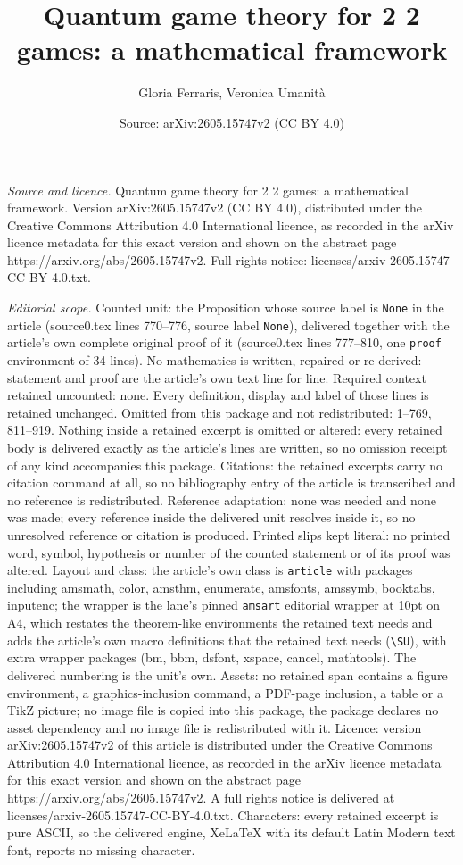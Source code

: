 \documentclass[10pt,a4paper]{amsart}
\title[Quantum game theory for 2 2 games: a mathematical framework]{Quantum game theory for 2 2 games: a mathematical framework}
\author{Gloria Ferraris, Veronica Umanit\`a}
\date{Source: arXiv:2605.15747v2 (CC BY 4.0)}
\begin{document}
\maketitle

\noindent\emph{Source and licence.} Quantum game theory for 2 2 games: a mathematical framework. Version arXiv:2605.15747v2 (CC BY 4.0), distributed under the Creative Commons Attribution 4.0 International licence, as recorded in the arXiv licence metadata for this exact version and shown on the abstract page https://arxiv.org/abs/2605.15747v2. Full rights notice: licenses/arxiv-2605.15747-CC-BY-4.0.txt.\par\smallskip

\noindent\textit{Editorial scope.} Counted unit: the Proposition whose source label is \texttt{None} in the article (source0.tex lines 770--776, source label \texttt{None}), delivered together with the article's own complete original proof of it (source0.tex lines 777--810, one \texttt{proof} environment of 34 lines). No mathematics is written, repaired or re-derived: statement and proof are the article's own text line for line. Required context retained uncounted: none. Every definition, display and label of those lines is retained unchanged. Omitted from this package and not redistributed: 1--769, 811--919. Nothing inside a retained excerpt is omitted or altered: every retained body is delivered exactly as the article's lines are written, so no omission receipt of any kind accompanies this package. Citations: the retained excerpts carry no citation command at all, so no bibliography entry of the article is transcribed and no reference is redistributed. Reference adaptation: none was needed and none was made; every reference inside the delivered unit resolves inside it, so no unresolved reference or citation is produced. Printed slips kept literal: no printed word, symbol, hypothesis or number of the counted statement or of its proof was altered. Layout and class: the article's own class is \texttt{article} with packages including amsmath, color, amsthm, enumerate, amsfonts, amssymb, booktabs, inputenc; the wrapper is the lane's pinned \texttt{amsart} editorial wrapper at 10pt on A4, which restates the theorem-like environments the retained text needs and adds the article's own macro definitions that the retained text needs (\texttt{\textbackslash SU}), with extra wrapper packages (bm, bbm, dsfont, xspace, cancel, mathtools). The delivered numbering is the unit's own. Assets: no retained span contains a figure environment, a graphics-inclusion command, a PDF-page inclusion, a table or a TikZ picture; no image file is copied into this package, the package declares no asset dependency and no image file is redistributed with it. Licence: version arXiv:2605.15747v2 of this article is distributed under the Creative Commons Attribution 4.0 International licence, as recorded in the arXiv licence metadata for this exact version and shown on the abstract page https://arxiv.org/abs/2605.15747v2. A full rights notice is delivered at licenses/arxiv-2605.15747-CC-BY-4.0.txt. Characters: every retained excerpt is pure ASCII, so the delivered engine, XeLaTeX with its default Latin Modern text font, reports no missing character.
\end{document}

